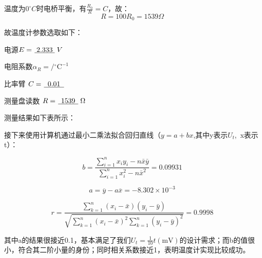 \documentclass[UTF8]{ctexart}
\begin{document}
温度为$0^{\circ}C$时电桥平衡，有$\frac{R_{0}}{R}=C $，故：
$$
R=100R_0=1539\Omega
$$

故温度计参数选取如下：

电源$E=\dlmu[1cm]{2.333}V$

电阻系数$\alpha_R=$$/{ }^{\circ}\mathrm{C}^{-1}$ 

比率臂 $ C=\dlmu[1cm]{0.01}$  

测量盘读数  $R =\dlmu[1cm]{1539} \Omega$

测量结果如下表所示：


接下来使用计算机通过最小二乘法拟合回归直线（$y=a+bx$,其中y表示$U_t$,~x表示t）：

$$
b=\frac{\sum_{i=1}^{n} x_{i} y_{i}-n \bar{x} \bar{y}}{\sum_{i=1}^{n} x_{i}^{2}-n \bar{x}^{2}} =0.09931
$$


$$
a=\overline{y}-a\overline{x} = -8.302\times10^{-3}
$$

$$
  r=\frac{\sum_{k=1}^n(x_i-\bar{x})
  (y_i-\bar{y})}
  {\sqrt{\sum_{k=1}^n(x_i-\bar{x})^2
  \sum_{k=1}^n(y_i-\bar{y})^2}}=0.9998
$$


其中a的结果很接近0.1，基本满足了我们$U_{t}=\frac{1}{10} t(\mathrm{mV}) $的设计需求；而b的值很小，符合其二阶小量的身份；同时相关系数接近1，表明温度计实现比较成功。
\end{document}
